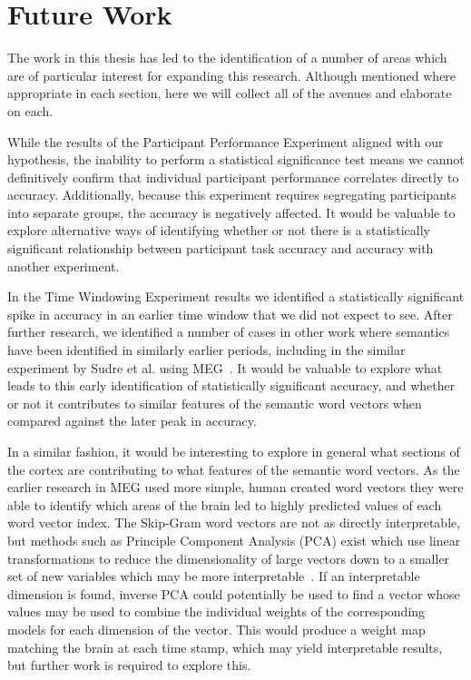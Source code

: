 \section{Future Work}

The work in this thesis has led to the identification of a number of areas 
which are of particular interest for expanding this research. Although 
mentioned where appropriate in each section, here we will collect all of the 
avenues and elaborate on each.

While the results of the Participant Performance Experiment aligned with our 
hypothesis, the inability to perform a statistical significance test means we 
cannot definitively confirm that individual participant performance correlates 
directly to \tvt accuracy. Additionally, because this experiment requires 
segregating participants into separate groups, the \tvt accuracy is negatively 
affected. It would be valuable to explore alternative ways of identifying 
whether or not there is a statistically significant relationship between 
participant task accuracy and \tvt accuracy with another experiment.

In the Time Windowing Experiment results we identified a statistically 
significant spike in \tvt accuracy in an earlier time window that we did not 
expect to see. After further research, we identified a number of cases in other 
work where semantics have been identified in similarly earlier periods, 
including in the similar experiment by Sudre et al. using MEG~\cite{Sudre2012}.
It would be valuable to explore what leads to this early identification of 
statistically significant accuracy, and whether or not it contributes to 
similar features of the semantic word vectors when compared against the later 
peak in accuracy.

In a similar fashion, it would be interesting to explore in general what 
sections of the cortex are contributing to what features of the semantic word 
vectors. As the earlier research in MEG used more simple, human created word 
vectors they were able to identify which areas of the brain led to highly 
predicted values of each word vector index. The Skip-Gram word vectors are not 
as directly interpretable, but methods such as Principle Component Analysis 
(PCA) exist which use linear transformations to reduce the dimensionality of 
large vectors down to a smaller set of new variables which may be more 
interpretable~\cite{jolliffe2016principal}. If an interpretable dimension is 
found, inverse PCA could potentially be used to find a vector whose values may 
be used to combine the individual weights of the corresponding models for each 
dimension of the vector. This would produce a weight map matching the brain at 
each time stamp, which may yield interpretable results, but further work is 
required to explore this.

